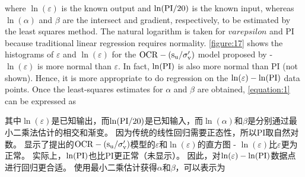 \begin{paracol}{2}
    where $\ln(\varepsilon)$ is the known output and $\ln(\rm{PI}/20)$ is the known input, whereas $\ln(\alpha)$ and $\beta$ are the intersect and gradient, respectively, to be estimated by the least squares method. The natural logarithm is taken for $varepsilon$ and PI because traditional linear regression requires normality. \autoref{figure:17} shows the histograms of $\varepsilon$ and $\ln(\varepsilon)$ for the $\rm{OCR}-(s_u/\sigma_v')$ model proposed by \citet{Jamiolkowski198557} - $\ln(\varepsilon)$ is more normal than $\varepsilon$. In fact, $\ln(\rm{PI})$ is also more normal than PI (not shown). Hence, it is more appropriate to do regression on the $\ln(\varepsilon)-\ln(\rm{PI})$ data points. Once the least-squares estimates for $\alpha$ and $\beta$ are obtained, \autoref{equation:1} can be expressed as

    \switchcolumn

    其中$\ln(\varepsilon)$是已知输出，而$\ln(\rm{PI}/20)$是已知输入，而$\ln(\alpha)$和$\beta$是分别通过最小二乘法估计的相交和渐变。 因为传统的线性回归需要正态性，所以PI取自然对数。 显示了\citet{Jamiolkowski198557}提出的$\rm{OCR}-(s_u/\sigma_v')$模型的$\varepsilon$和$\ln(\varepsilon)$的直方图 - $\ln(\varepsilon)$比$\varepsilon$更为正常。 实际上，$\ln(\rm{PI})$也比PI更正常（未显示）。 因此，对$\ln(\varepsilon)-\ln(\rm{PI})$数据点进行回归更合适。 使用最小二乘估计获得$\alpha$和$\beta$，可以表示为


\end{paracol}
